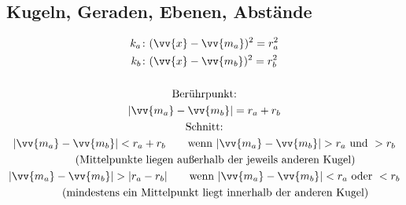 \subsection{Kugeln, Geraden, Ebenen, Abstände}
\begin{gather*}
  k_a \colon (\vv{x} - \vv{m_a})^2 = r_a^2 \\
  k_b \colon (\vv{x} - \vv{m_b})^2 = r_b^2 \\\\
  \text{Berührpunkt:} \\
  |\vv{m_a} - \vv{m_b}| = r_a + r_b \\
  \text{Schnitt:} \\
  |\vv{m_a} - \vv{m_b}| < r_a + r_b \qquad \text{wenn } |\vv{m_a} - \vv{m_b}| > r_a \text{ und } > r_b \\
  \qquad \text{(Mittelpunkte liegen außerhalb der jeweils anderen Kugel)} \\
  |\vv{m_a} - \vv{m_b}| > |r_a - r_b| \qquad \text{wenn } |\vv{m_a} - \vv{m_b}| < r_a \text{ oder } < r_b \\
  \qquad \text{(mindestens ein Mittelpunkt liegt innerhalb der anderen Kugel)}
\end{gather*}
